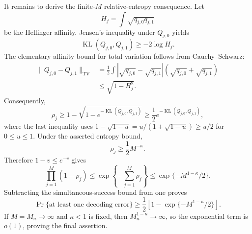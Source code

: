 It remains to derive the finite-\(M\) relative-entropy consequence.  Let
\[
 H_j=\int\sqrt{q_{j,0}q_{j,1}}
\]
be the Hellinger affinity.  Jensen's inequality under \(Q_{j,0}\) yields
\[
 \operatorname{KL}(Q_{j,0},Q_{j,1})\geq-2\log H_j.
\]
The elementary affinity bound for total variation follows from Cauchy--Schwarz:
\[
\begin{aligned}
 \lVert Q_{j,0}-Q_{j,1}\rVert_{\mathrm{TV}}
 &=\frac12\int|\sqrt{q_{j,0}}-\sqrt{q_{j,1}}|
             (\sqrt{q_{j,0}}+\sqrt{q_{j,1}})\\
 &\leq\sqrt{1-H_j^2}.
\end{aligned}
\]
Consequently,
\[
 \rho_j
 \geq1-\sqrt{1-e^{-\operatorname{KL}(Q_{j,0},Q_{j,1})}}
 \geq\frac12e^{-\operatorname{KL}(Q_{j,0},Q_{j,1})},
\]
where the last inequality uses \(1-\sqrt{1-u}=u/(1+\sqrt{1-u})\geq u/2\) for \(0\leq u\leq1\).  Under the asserted entropy bound,
\[
 \rho_j\geq\frac12M^{-\kappa}.
\]
Therefore \(1-v\leq e^{-v}\) gives
\[
 \prod_{j=1}^M(1-\rho_j)
 \leq\exp\!\left\{-\sum_{j=1}^M\rho_j\right\}
 \leq\exp\{-M^{1-\kappa}/2\}.
\]
Subtracting the simultaneous-success bound from one proves
\[
 \Pr\{\text{at least one decoding error}\}
 \geq\frac12\left[1-\exp\{-M^{1-\kappa}/2\}\right].
\]
If \(M=M_n\to\infty\) and \(\kappa<1\) is fixed, then \(M_n^{1-\kappa}\to\infty\), so the exponential term is \(o(1)\), proving the final assertion.